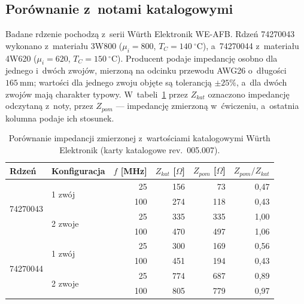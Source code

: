 \documentclass[11pt,a4paper]{article}
\begin{document}
\subsection{Porównanie z~notami katalogowymi}

Badane rdzenie pochodzą z~serii Würth Elektronik WE-AFB. Rdzeń 74270043 wykonano
z~materiału 3W800 ($\mu_i = 800$, $T_C = 140\ ^\circ\mathrm{C}$), a~74270044
z~materiału 4W620 ($\mu_i = 620$, $T_C = 150\ ^\circ\mathrm{C}$). Producent podaje
impedancję osobno dla jednego i~dwóch zwojów, mierzoną na odcinku przewodu AWG26
o~długości $165\ \mathrm{mm}$; wartości dla jednego zwoju objęte są tolerancją
$\pm 25\%$, a~dla dwóch zwojów mają charakter typowy.
W~tabeli~\ref{tab:katalog} przez $Z_{kat}$ oznaczono impedancję odczytaną z~noty,
przez $Z_{pom}$ --- impedancję zmierzoną w~ćwiczeniu, a~ostatnia kolumna podaje
ich stosunek.

\begin{table}[H]
  \centering
  \small
  \caption{Porównanie impedancji zmierzonej z~wartościami katalogowymi
           Würth Elektronik (karty katalogowe rev.~005.007).}
  \label{tab:katalog}
  \renewcommand{\arraystretch}{1.15}
  \begin{tabular}{|l|l|r|r|r|r|}
    \hline
    \textbf{Rdzeń} & \textbf{Konfiguracja} & $f$ [MHz] & $Z_{kat}$ [$\Omega$] & $Z_{pom}$ [$\Omega$]
          & $Z_{pom}/Z_{kat}$ \\
    \hline
    \multirow{4}{*}{74270043} & \multirow{2}{*}{1 zwój}  & 25  & 156 & 73  & 0,47 \\
    \cline{3-6}
                              &                          & 100 & 274 & 118 & 0,43 \\
    \cline{2-6}
                              & \multirow{2}{*}{2 zwoje} & 25  & 335 & 335 & 1,00 \\
    \cline{3-6}
                              &                          & 100 & 470 & 497 & 1,06 \\
    \hline
    \multirow{4}{*}{74270044} & \multirow{2}{*}{1 zwój}  & 25  & 300 & 169 & 0,56 \\
    \cline{3-6}
                              &                          & 100 & 451 & 194 & 0,43 \\
    \cline{2-6}
                              & \multirow{2}{*}{2 zwoje} & 25  & 774 & 687 & 0,89 \\
    \cline{3-6}
                              &                          & 100 & 805 & 779 & 0,97 \\
    \hline
  \end{tabular}
\end{table}
\end{document}
